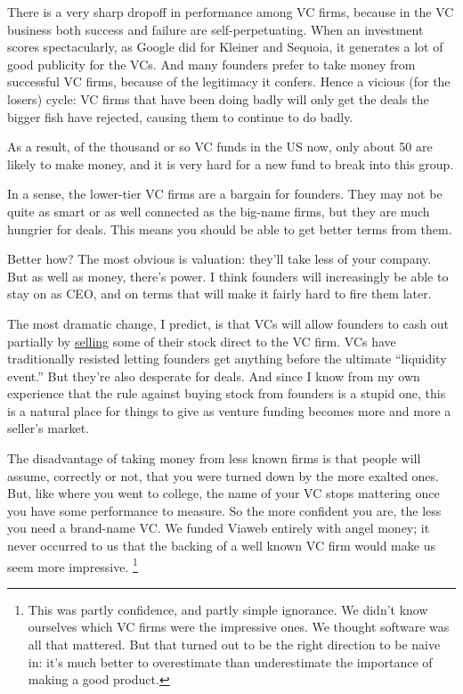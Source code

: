 \documentclass[12pt]{book}
\begin{document}
There is a very sharp dropoff in performance among VC firms, because in
the VC business both success and failure are self-perpetuating. When an
investment scores spectacularly, as Google did for Kleiner and Sequoia,
it generates a lot of good publicity for the VCs. And many founders
prefer to take money from successful VC firms, because of the legitimacy
it confers. Hence a vicious (for the losers) cycle: VC firms that have
been doing badly will only get the deals the bigger fish have rejected,
causing them to continue to do badly.

As a result, of the thousand or so VC funds in the US now, only about 50
are likely to make money, and it is very hard for a new fund to break
into this group.

In a sense, the lower-tier VC firms are a bargain for founders. They may
not be quite as smart or as well connected as the big-name firms, but
they are much hungrier for deals. This means you should be able to get
better terms from them.

Better how? The most obvious is valuation: they'll take less of your
company. But as well as money, there's power. I think founders will
increasingly be able to stay on as CEO, and on terms that will make it
fairly hard to fire them later.

The most dramatic change, I predict, is that VCs will allow founders to
cash out partially by \href{vcsqueeze.html}{selling} some of their stock
direct to the VC firm. VCs have traditionally resisted letting founders
get anything before the ultimate ``liquidity event.'' But they're also
desperate for deals. And since I know from my own experience that the
rule against buying stock from founders is a stupid one, this is a
natural place for things to give as venture funding becomes more and
more a seller's market.

The disadvantage of taking money from less known firms is that people
will assume, correctly or not, that you were turned down by the more
exalted ones. But, like where you went to college, the name of your VC
stops mattering once you have some performance to measure. So the more
confident you are, the less you need a brand-name VC. We funded Viaweb
entirely with angel money; it never occurred to us that the backing of a
well known VC firm would make us seem more impressive.
\footnote{This was partly confidence, and partly simple ignorance. We
didn't know ourselves which VC firms were the impressive ones. We
thought software was all that mattered. But that turned out to be the
right direction to be naive in: it's much better to overestimate than
underestimate the importance of making a good product.}
\end{document}
